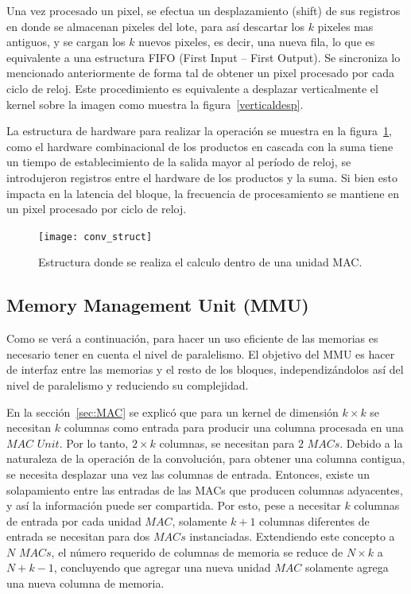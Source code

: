 Una vez procesado un pixel, se efectua un desplazamiento (shift) de sus
registros en donde se almacenan pixeles del lote, para así descartar los $k$
pixeles mas antiguos, y se cargan los $k$ nuevos pixeles, es decir, una nueva
fila, lo que es equivalente a una estructura FIFO (First Input – First Output).
Se sincroniza lo mencionado anteriormente de forma tal de obtener un pixel
procesado por cada ciclo de reloj. Este procedimiento es equivalente a desplazar
verticalmente el kernel sobre la imagen como muestra la figura~\ref{verticaldesp}.

La estructura de hardware para realizar la operación se muestra en la figura~\ref{conv_struct},
como el hardware combinacional de los productos en cascada con la suma tiene un
tiempo de establecimiento de la salida mayor al período de reloj, se
introdujeron registros entre el hardware de los productos y la suma. Si bien
esto impacta en la latencia del bloque, la frecuencia de procesamiento se
mantiene en un pixel procesado por ciclo de reloj. 

\begin{figure}
\centering
\texttt{[image: conv\_struct]}
\caption{Estructura donde se realiza el calculo dentro de una unidad MAC.}
\label{conv_struct}
\end{figure}

\subsection{Memory Management Unit (MMU)}

Como se verá a continuación, para hacer un uso eficiente de las memorias es
necesario tener en cuenta el nivel de paralelismo. El objetivo del MMU es hacer
de interfaz entre las memorias y el resto de los bloques, independizándolos así del
nivel de paralelismo y reduciendo su complejidad.

En la sección~\ref{sec:MAC} se explicó que para un kernel de dimensión
$k \times k$ se necesitan $k$ columnas como entrada para producir una columna
procesada en una $MAC$ $Unit$. Por lo tanto, $2 \times k$ columnas, se necesitan
para $2$ $MACs$. Debido a la naturaleza de la operación de la convolución, para
obtener una columna contigua, se necesita desplazar una vez las columnas de
entrada. Entonces, existe un solapamiento entre las entradas de las MACs
que producen columnas adyacentes, y así la información puede ser compartida. 
Por esto, pese a necesitar $k$ columnas de entrada por cada unidad $MAC$,
solamente $k+1$ columnas diferentes de entrada se necesitan para dos $MACs$
instanciadas. Extendiendo este concepto a $N$ $MACs$, el número requerido de
columnas de memoria se reduce de $N \times k$ a $N+k-1$, concluyendo que
agregar una nueva unidad $MAC$ solamente agrega una nueva columna de memoria.

